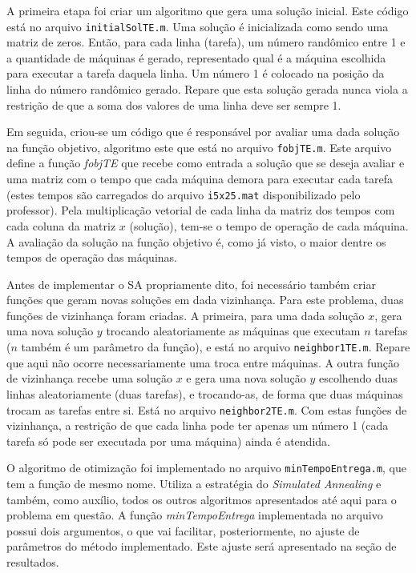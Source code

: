 \documentclass[conference]{IEEEtran}
\begin{document}
A primeira etapa foi criar um algoritmo que gera uma solução inicial. Este código está no arquivo \texttt{initialSolTE.m}. Uma solução é inicializada como sendo uma matriz de zeros. Então, para cada linha (tarefa), um número randômico entre 1 e a quantidade de máquinas é gerado, representado qual é a máquina escolhida para executar a tarefa daquela linha. Um número 1 é colocado na posição da linha do número randômico gerado. Repare que esta solução gerada nunca viola a restrição de que a soma dos valores de uma linha deve ser sempre 1.

Em seguida, criou-se um código que é responsável por avaliar uma dada solução na função objetivo, algoritmo este que está no arquivo \texttt{fobjTE.m}. Este arquivo define a função \emph{fobjTE} que recebe como entrada a solução que se deseja avaliar e uma matriz com o tempo que cada máquina demora para executar cada tarefa (estes tempos são carregados do arquivo \texttt{i5x25.mat} disponibilizado pelo professor). Pela multiplicação vetorial de cada linha da matriz dos tempos com cada coluna da matriz $x$ (solução), tem-se o tempo de operação de cada máquina. A avaliação da solução na função objetivo é, como já visto, o maior dentre os tempos de operação das máquinas.

Antes de implementar o SA propriamente dito, foi necessário também criar funções que geram novas soluções em dada vizinhança. Para este problema, duas funções de vizinhança foram criadas. A primeira, para uma dada solução $x$, gera uma nova solução $y$ trocando aleatoriamente as máquinas que executam $n$ tarefas ($n$ também é um parâmetro da função), e está no arquivo \texttt{neighbor1TE.m}. Repare que aqui não ocorre necessariamente uma troca entre máquinas. A outra função de vizinhança recebe uma solução $x$ e gera uma nova solução $y$ escolhendo duas linhas aleatoriamente (duas tarefas), e trocando-as, de forma que duas máquinas trocam as tarefas entre si. Está no arquivo \texttt{neighbor2TE.m}. Com estas funções de vizinhança, a restrição de que cada linha pode ter apenas um número 1 (cada tarefa só pode ser executada por uma máquina) ainda é atendida.

O algoritmo de otimização foi implementado no arquivo \texttt{minTempoEntrega.m}, que tem a função de mesmo nome. Utiliza a estratégia do \textit{Simulated Annealing} e também, como auxílio, todos os outros algoritmos apresentados até aqui para o problema em questão. A função \textit{minTempoEntrega} implementada no arquivo possui dois argumentos, o que vai facilitar, posteriormente, no ajuste de parâmetros do método implementado. Este ajuste será apresentado na seção de resultados.
\end{document}
